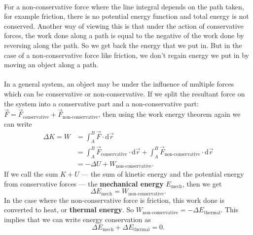 \documentclass[../newtonian_mechanics.tex]{subfiles}
\begin{document}
        \paragraph{}
        For a non-conservative force where the line integral depends on the path taken, for example friction, there is no potential energy function and total energy is not conserved.
        Another way of viewing this is that under the action of conservative forces, the work done along a path is equal to the negative of the work done by reversing along the path.
        So we get back the energy that we put in.
        But in the case of a non-conservative force like friction, we don't regain energy we put in by moving an object along a path.

        \paragraph{}
        In a general system, an object may be under the influence of multiple forces which can be conservative or non-conservative.
        If we split the resultant force on the system into a conservative part and a non-conservative part: $\vec{F}=\vec{F}_\text{conservative}+\vec{F}_\text{non-conservative}$, then using the work energy theorem again we can write
        \begin{align}
            \Delta K = W &= \int_A^B \vec{F}\cdot\mathrm{d}\vec{r}\\
            &= \int_A^B \vec{F}_\text{conservative}\cdot\mathrm{d}\vec{r} + \int_A^B \vec{F}_\text{non-conservative}\cdot\mathrm{d}\vec{r}\\
            &= - \Delta U + W_\text{non-conservative}.
        \end{align}
        If we call the sum $K+U$ --- the sum of kinetic energy and the potential energy from conservative forces --- the \textbf{mechanical energy} $E_\text{mech}$, then we get
        \begin{equation}
            \Delta E_\text{mech} = W_\text{non-conservative}.
        \end{equation}
        In the case where the non-conservative force is friction, this work done is converted to heat, or \textbf{thermal energy}.
        So $W_\text{non-conservative} = -\Delta E_\text{thermal}$.
        This implies that we can write energy conservation as
        \begin{equation}
            \Delta E_\text{mech} + \Delta E_\text{thermal} = 0.
        \end{equation}
\end{document}
